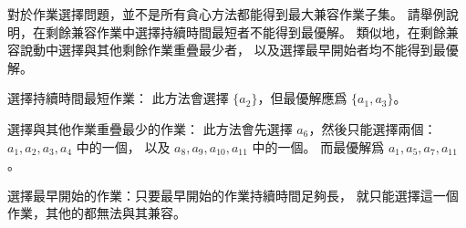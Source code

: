 \startEXERCISE
對於作業選擇問題，並不是所有貪心方法都能得到最大兼容作業子集。
請舉例說明，在剩餘兼容作業中選擇持續時間最短者不能得到最優解。
類似地，在剩餘兼容說動中選擇與其他剩餘作業重疊最少者，
以及選擇最早開始者均不能得到最優解。
\stopEXERCISE

\startANSWER
\startigBase[a]\startitem
選擇持續時間最短作業：
此方法會選擇 $\{a_2\}$，但最優解應爲 $\{a_1,a_3\}$。
\stopitem\stopigBase

\startigBase[continue]\startitem
選擇與其他作業重疊最少的作業：
此方法會先選擇 $a_6$，然後只能選擇兩個： $a_1,a_2,a_3,a_4$ 中的一個，
以及 $a_8,a_9,a_{10},a_{11}$ 中的一個。
而最優解爲 $a_1,a_5,a_7,a_{11}$。
\stopitem\stopigBase

\startigBase[continue]\startitem
選擇最早開始的作業：只要最早開始的作業持續時間足夠長，
就只能選擇這一個作業，其他的都無法與其兼容。
\stopitem\stopigBase
\stopANSWER
